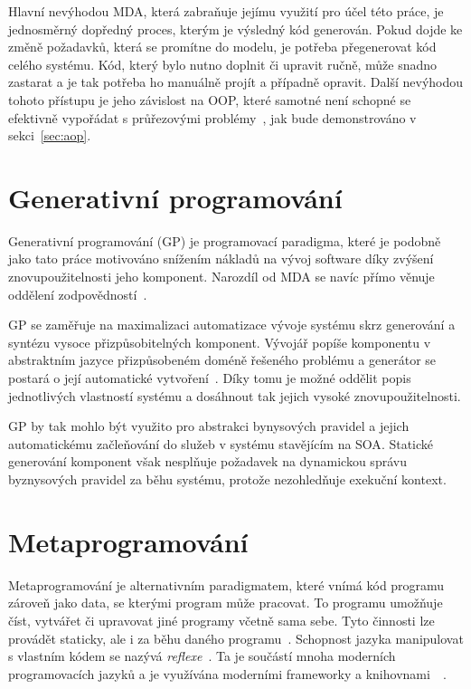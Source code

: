 Hlavní nevýhodou \gls{MDA}, která zabraňuje jejímu využití pro účel této práce,
je jednosměrný dopředný proces, kterým je výsledný kód generován.
Pokud dojde ke změně požadavků, která se promítne do modelu, je potřeba přegenerovat
kód celého systému. Kód, který bylo nutno doplnit či upravit ručně, může snadno zastarat a je tak
potřeba ho manuálně projít a případně opravit. Další nevýhodou tohoto přístupu je jeho závislost na \gls{OOP},
které samotné není schopné se efektivně vypořádat s průřezovými problémy~\cite{kennard2009separation, cemus2014aspect},
jak bude demonstrováno v sekci~\ref{sec:aop}.

\section{Generativní programování}

Generativní programování (\gls{GP}) je programovací paradigma, které je podobně jako
tato práce motivováno snížením nákladů na vývoj software díky zvýšení znovupoužitelnosti
jeho komponent. Narozdíl od \gls{MDA} se navíc přímo věnuje oddělení zodpovědností~\cite{czarnecki2000generative, cemus2017separation}.

\gls{GP} se zaměřuje na maximalizaci automatizace vývoje systému
skrz generování a syntézu vysoce přizpůsobitelných komponent. Vývojář
popíše komponentu v abstraktním jazyce přizpůsobeném doméně řešeného
problému a generátor se postará o její automatické vytvoření~\cite{czarnecki2000generative}.
Díky tomu je možné oddělit popis jednotlivých vlastností systému a dosáhnout tak
jejich vysoké znovupoužitelnosti.

\gls{GP} by tak mohlo být využito pro abstrakci bynysových pravidel a jejich
automatickému začleňování do služeb v systému stavějícím na \gls{SOA}.
Statické generování komponent však nesplňuje požadavek na dynamickou správu
byznysových pravidel za běhu systému, protože nezohledňuje exekuční kontext.

\section{Metaprogramování}

Metaprogramování je alternativním paradigmatem, které vnímá kód programu
zároveň jako data, se kterými program může pracovat. To programu umožňuje
číst, vytvářet či upravovat jiné programy včetně sama sebe. Tyto činnosti
lze provádět staticky, ale i za běhu daného programu~\cite{sheard2001accomplishments, czarnecki2000generative}.
Schopnost jazyka manipulovat s vlastním kódem se nazývá \textit{reflexe}~\cite{sobel1996introduction}.
Ta je součástí mnoha moderních programovacích jazyků a je využívána moderními frameworky a
knihovnami~\cite{vandevoorde2002c++}~\cite{forman2004java}.

